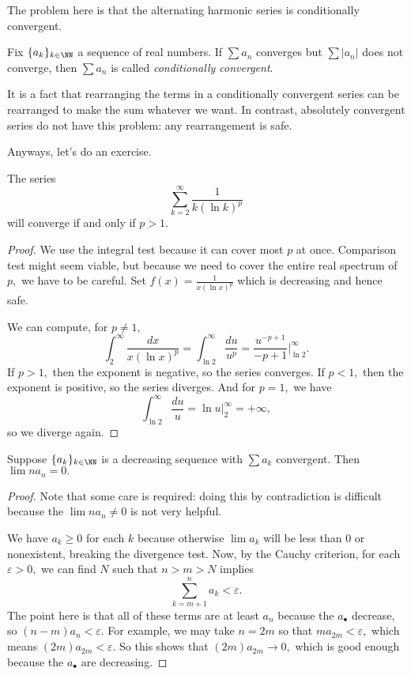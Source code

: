 The problem here is that the alternating harmonic series is conditionally convergent.
\begin{definition}
	Fix $\{a_k\}_{k\in\NN}$ a sequence of real numbers. If $\sum a_n$ converges but $\sum|a_n|$ does not converge, then $\sum a_n$ is called \textit{conditionally convergent}.
\end{definition}
It is a fact that rearranging the terms in a conditionally convergent series can be rearranged to make the sum whatever we want. In contrast, absolutely convergent series do not have this problem: any rearrangement is safe.

Anyways, let's do an exercise.
\begin{exercise}
	The series
	\[\sum_{k=2}^\infty\frac1{k(\ln k)^p}\]
	will converge if and only if $p>1.$
\end{exercise}
\begin{proof}
	We use the integral test because it can cover most $p$ at once. Comparison test might seem viable, but because we need to cover the entire real spectrum of $p,$ we have to be careful. Set $f(x)=\frac1{x(\ln x)^p}$ which is decreasing and hence safe.
	
	We can compute, for $p\ne1,$
	\[\int_2^\infty\frac{dx}{x(\ln x)^p}=\int_{\ln2}^\infty\frac{du}{u^p}=\frac{u^{-p+1}}{-p+1}\bigg|_{\ln2}^\infty.\]
	If $p>1,$ then the exponent is negative, so the series converges. If $p<1,$ then the exponent is positive, so the series diverges. And for $p=1,$ we have
	\[\int_{\ln2}^\infty\frac{du}u=\ln u\bigg|_2^\infty=+\infty,\]
	so we diverge again.
\end{proof}
\begin{exercise}
	Suppose $\{a_k\}_{k\in\NN}$ is a decreasing sequence with $\sum a_k$ convergent. Then $\lim na_n=0.$
\end{exercise}
\begin{proof}
	Note that some care is required: doing this by contradiction is difficult because the $\lim na_n\ne0$ is not very helpful.

	We have $a_k\ge0$ for each $k$ because otherwise $\lim a_k$ will be less than $0$ or nonexistent, breaking the divergence test. Now, by the Cauchy criterion, for each $\varepsilon>0,$ we can find $N$ such that $n>m>N$ implies
	\[\sum_{k=m+1}^na_k<\varepsilon.\]
	The point here is that all of these terms are at least $a_n$ because the $a_\bullet$ decrease, so $(n-m)a_n<\varepsilon.$ For example, we may take $n=2m$ so that $ma_{2m}<\varepsilon,$ which means $(2m)a_{2m}<\varepsilon.$ So this shows that $(2m)a_{2m}\to0,$ which is good enough because the $a_\bullet$ are decreasing.
\end{proof}

